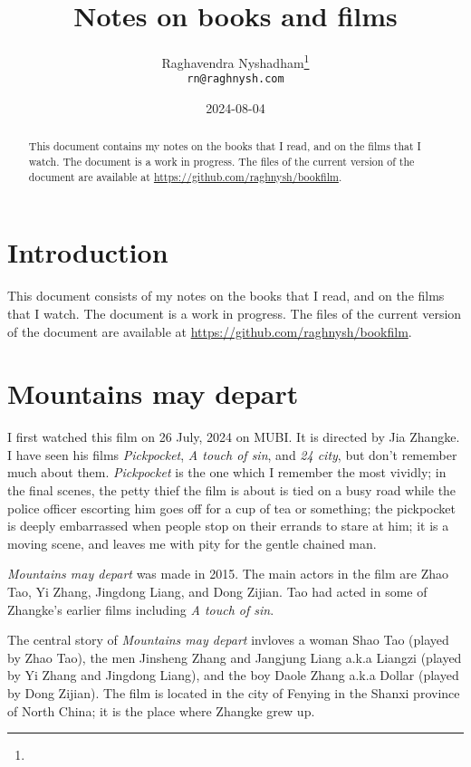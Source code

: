 \documentclass{article}
\title{Notes on books and films}
\author{Raghavendra Nyshadham\thanks{\cczero} \\
  {\normalsize\nolinkurl{rn@raghnysh.com}}}
\date{2024-08-04}
\begin{document}
\begin{titlingpage}
  \maketitle

  \begin{abstract}
    This document contains my notes on the books that I read, and on
    the films that I watch.  The document is a work in progress.  The
    files of the current version of the document are available at
    \url{https://github.com/raghnysh/bookfilm}.

  \end{abstract}
\end{titlingpage}

\tableofcontents

\section{Introduction}
\label{sec:113nrd0o}

This document consists of my notes on the books that I read, and on
the films that I watch.  The document is a work in progress.  The
files of the current version of the document are available at
\url{https://github.com/raghnysh/bookfilm}.

\section{Mountains may depart}
\label{sec:ov8yna0s}

I first watched this film on 26 July, 2024 on MUBI.  It is directed by
Jia Zhangke.  I have seen his films \emph{Pickpocket}, \emph{A touch
  of sin}, and \emph{24 city}, but don't remember much about them.
\emph{Pickpocket} is the one which I remember the most vividly; in the
final scenes, the petty thief the film is about is tied on a busy road
while the police officer escorting him goes off for a cup of tea or
something; the pickpocket is deeply embarrassed when people stop on
their errands to stare at him; it is a moving scene, and leaves me
with pity for the gentle chained man.

\emph{Mountains may depart} was made in 2015.  The main actors in the
film are Zhao Tao, Yi Zhang, Jingdong Liang, and Dong Zijian.  Tao had
acted in some of Zhangke's earlier films including \emph{A touch of
  sin}.

The central story of \emph{Mountains may depart} invloves a woman Shao
Tao (played by Zhao Tao), the men Jinsheng Zhang and Jangjung Liang
a.k.a Liangzi (played by Yi Zhang and Jingdong Liang), and the boy
Daole Zhang a.k.a Dollar (played by Dong Zijian).  The film is located
in the city of Fenying in the Shanxi province of North China; it is
the place where Zhangke grew up.
\end{document}
